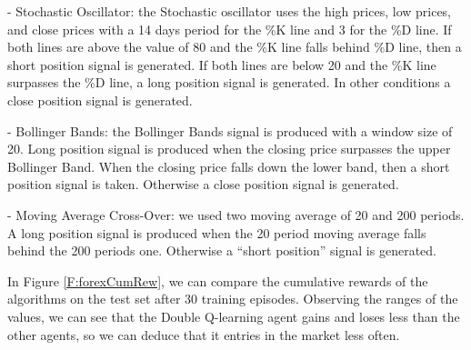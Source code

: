 - Stochastic Oscillator:
the Stochastic oscillator uses the high prices, low prices, and close prices with a 14 days period for the \%K line and 3  for the \%D line.
If both lines are above the value of 80 and the \%K line falls behind \%D line, then a short position signal is generated.
If both lines are below 20 and the \%K line surpasses the \%D line, a long position signal is generated. In other conditions a close position signal is generated.

- Bollinger Bands:
the Bollinger Bands signal is produced with a window size of 20.
Long position signal is produced when the closing price surpasses the upper Bollinger Band.
When the closing price falls down the lower band, then a short position signal is taken.
Otherwise a close position signal is generated.

- Moving Average Cross-Over:
we used two moving average of 20 and 200 periods. A long position signal is produced when the 20 period moving average falls behind the 200 periods one. Otherwise a “short position” signal is generated.

In Figure \ref{F:forexCumRew},  we can compare the cumulative rewards of the algorithms on the test set after 30 training episodes.
Observing the ranges of the values, we can see that the Double Q-learning agent gains and loses less than the other agents, so we can deduce that it entries in the market less often.